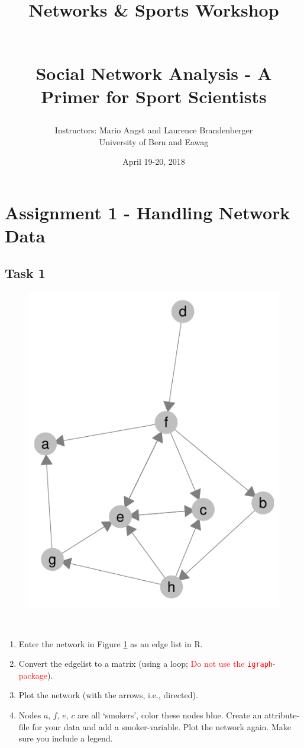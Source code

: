 \documentclass[12pt,a4paper]{article} %
\title{\begin{large}Networks \& Sports Workshop\end{large}\\[1cm] Social Network Analysis - A Primer for Sport Scientists}
\author{Instructors: Mario Angst and Laurence Brandenberger\\University of Bern and Eawag}
\date{April 19-20, 2018}
\begin{document}
\maketitle

%
\section{Assignment 1 - Handling Network Data}

\subsection{Task 1}

\begin{figure}[!hbt]
\begin{center}
\includegraphics[width = .6\textwidth]{randNW_directed.pdf}
\end{center}
~\label{rdn}
\end{figure}

\begin{enumerate}
	\item Enter the network in Figure \ref{rdn} as an edge list in R.
	\item Convert the edgelist to a matrix (using a loop; \textcolor{red}{Do not use the \texttt{igraph}-package}).
	\item Plot the network (with the arrows, i.e., directed).
	\item Nodes $a$, $f$, $e$, $c$ are all `smokers', color these nodes blue. Create an attribute-file for your data and add a smoker-variable. Plot the network again. Make sure you include a legend.
\end{enumerate}
\end{document}
